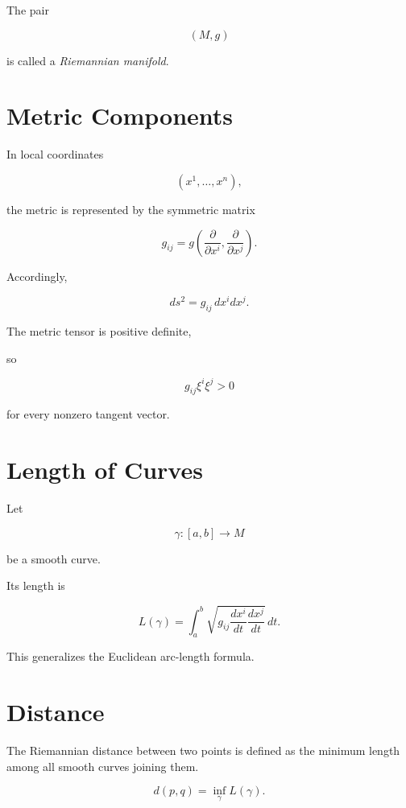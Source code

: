 \documentclass[11pt,fleqn]{book}
\numberwithin{equation}{chapter}
\theoremstyle{plain}
\theoremstyle{definition}
\theoremstyle{remark}
\begin{document}
The pair

\[
(M,g)
\]

is called a \emph{Riemannian manifold}.


\section{Metric Components}

In local coordinates

\[
(x^1,\ldots,x^n),
\]

the metric is represented by the symmetric matrix

\[
g_{ij}
=
g\!\left(
\frac{\partial}{\partial x^i},
\frac{\partial}{\partial x^j}
\right).
\]

Accordingly,

\[
\boxed{
ds^2
=
g_{ij}\,
dx^i
dx^j.
}
\]

The metric tensor is positive definite,

so

\[
g_{ij}\xi^i\xi^j>0
\]

for every nonzero tangent vector.


\section{Length of Curves}

Let

\[
\gamma:[a,b]\rightarrow M
\]

be a smooth curve.

Its length is

\[
\boxed{
L(\gamma)
=
\int_a^b
\sqrt{
g_{ij}
\frac{dx^i}{dt}
\frac{dx^j}{dt}
}\,
dt.
}
\]

This generalizes the Euclidean arc-length formula.


\section{Distance}

The Riemannian distance between two points is defined as the minimum
length among all smooth curves joining them.

\[
\boxed{
d(p,q)
=
\inf_\gamma
L(\gamma).
}
\]
\end{document}

